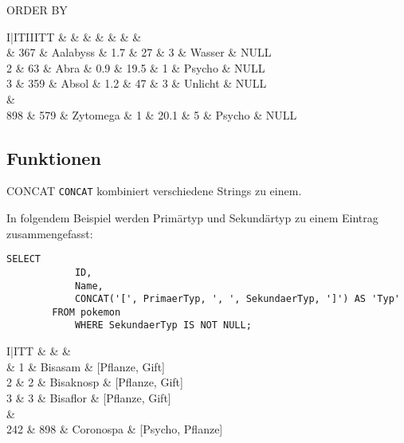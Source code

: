 \begin{sql}{ORDER BY}
    \setcounter{rownum}{0}
    \begin{tabular}{I|ITIIITT}
        &  &  &  &  &  &  &  \\ & 367 & Aalabyss & 1.7 & 27 & 3 & Wasser & NULL \\
        2 & 63 & Abra & 0.9 & 19.5 & 1 & Psycho & NULL \\
        3 & 359 & Absol & 1.2 & 47 & 3 & Unlicht & NULL \\       
         &  \\
        898 & 579 & Zytomega & 1 & 20.1 & 5 & Psycho & NULL \\
    \end{tabular}
\end{sql}

\subsection{Funktionen}

\begin{sql}{CONCAT}
    \texttt{CONCAT} kombiniert verschiedene Strings zu einem.

    In folgendem Beispiel werden Primärtyp und Sekundärtyp zu einem Eintrag zusammengefasst:

    \begin{lstlisting}[language=mysql]
        SELECT
            ID,
            Name,
            CONCAT('[', PrimaerTyp, ', ', SekundaerTyp, ']') AS 'Typ'
        FROM pokemon
            WHERE SekundaerTyp IS NOT NULL;
    \end{lstlisting}

    \setcounter{rownum}{0}
    \begin{tabular}{I|ITT}
        &  &  &  \\ & 1 & Bisasam & [Pflanze, Gift] \\
        2 & 2 & Bisaknosp & [Pflanze, Gift] \\
        3 & 3 & Bisaflor & [Pflanze, Gift] \\
         &  \\
        242 & 898 & Coronospa & [Psycho, Pflanze] \\
    \end{tabular}
\end{sql}

